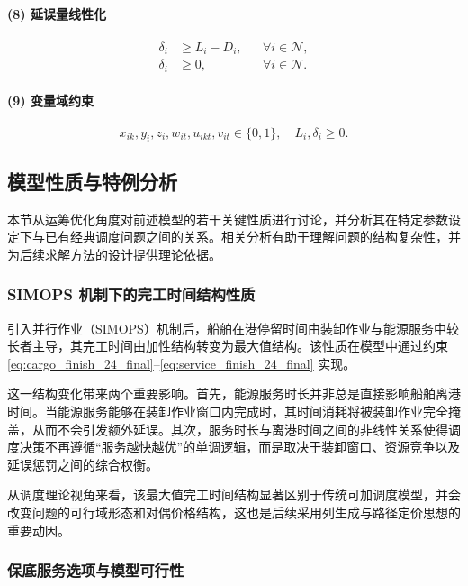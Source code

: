 \documentclass[UTF8, a4paper, 12pt]{ctexart}
\begin{document}
\paragraph{(8) 延误量线性化}
\begin{align}
\delta_i &\ge L_i - D_i,
&& \forall i \in \mathcal{N}, \\
\delta_i &\ge 0,
&& \forall i \in \mathcal{N}.
\end{align}

\paragraph{(9) 变量域约束}
\begin{equation}
x_{ik},y_i,z_i,w_{it},u_{ikt},v_{it} \in \{0,1\},
\quad
L_i,\delta_i \ge 0.
\end{equation}

\subsection{模型性质与特例分析}
\label{sec:properties}

本节从运筹优化角度对前述模型的若干关键性质进行讨论，并分析其在特定参数设定下与已有经典调度问题之间的关系。相关分析有助于理解问题的结构复杂性，并为后续求解方法的设计提供理论依据。

\subsubsection{SIMOPS 机制下的完工时间结构性质}

引入并行作业（SIMOPS）机制后，船舶在港停留时间由装卸作业与能源服务中较长者主导，其完工时间由加性结构转变为最大值结构。该性质在模型中通过约束
\eqref{eq:cargo_finish_24_final}--\eqref{eq:service_finish_24_final} 实现。

这一结构变化带来两个重要影响。首先，能源服务时长并非总是直接影响船舶离港时间。当能源服务能够在装卸作业窗口内完成时，其时间消耗将被装卸作业完全掩盖，从而不会引发额外延误。其次，服务时长与离港时间之间的非线性关系使得调度决策不再遵循“服务越快越优”的单调逻辑，而是取决于装卸窗口、资源竞争以及延误惩罚之间的综合权衡。

从调度理论视角来看，该最大值完工时间结构显著区别于传统可加调度模型，并会改变问题的可行域形态和对偶价格结构，这也是后续采用列生成与路径定价思想的重要动因。

\subsubsection{保底服务选项与模型可行性}
\end{document}
